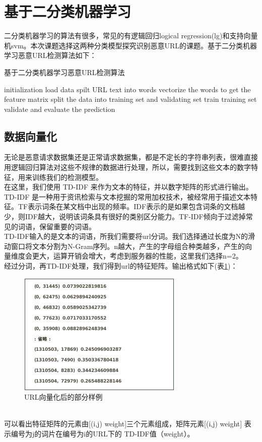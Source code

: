 \section{基于二分类机器学习}
二分类机器学习的算法有很多，常见的有逻辑回归logical regression(lg)和支持向量机svm。本次课题选择这两种分类模型探究识别恶意URL的课题。基于二分类机器学习恶意URL检测算法如下：
\begin{algorithm}[!h]
    \SetAlgoNoLine
    \caption{基于二分类机器学习恶意URL检测算法}
    initialization\;
    load data\; 
    spilt URL text into words\;
    vectorize the words to get the feature matrix\;
    split the data into training set and validating set\;
    train training set\;
    validate and evaluate the prediction\;
\end{algorithm}
\subsection{数据向量化}
无论是恶意请求数据集还是正常请求数据集，都是不定长的字符串列表，很难直接用逻辑回归算法对这些不规律的数据进行处理，所以，需要找到这些文本的数字特征，用来训练我们的检测模型。
\\\indent{}在这里，我们使用 TD-IDF 来作为文本的特征，并以数字矩阵的形式进行输出。TD-IDF 是一种用于资讯检索与文本挖掘的常用加权技术，被经常用于描述文本特征。TF表示词条在某文档中出现的频率。IDF表示的是如果包含词条的文档越少，则IDF越大，说明该词条具有很好的类别区分能力。TF-IDF倾向于过滤掉常见的词语，保留重要的词语。
\\\indent{}TD-IDF输入的是文本的词语，所我们需要将url分词。我们选择通过长度为N的滑动窗口将文本分割为N-Gram序列。n越大，产生的字母组合种类越多，产生的向量维度会更大，运算开销会增大，考虑到服务器的性能，这里我们选择n=2。
\\\indent{}经过分词，再TD-IDF处理，我们得到url的特征矩阵。输出格式如下(表\ref{fig:vec})：
\begin{figure}[!h]
    \setlength{\abovecaptionskip}{0.cm}
    \setlength{\belowcaptionskip}{-0.cm}
    \centering
     \includegraphics[scale=0.55]{Figs/vec.png}
    \caption{URL向量化后的部分样例}
    \label{fig:vec}
\end{figure}
\\\indent{}可以看出特征矩阵的元素由[(i,j) weight]三个元素组成，矩阵元素[(i,j) weight] 表示编号为j的词片在编号为i的URL下的 TD-IDF值（weight）。
